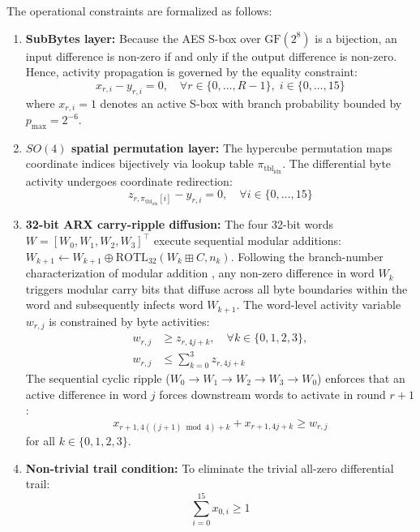 \documentclass[10pt,twocolumn]{article}
\begin{document}
The operational constraints are formalized as follows:
\begin{enumerate}
    \item \textbf{SubBytes layer:} Because the AES S-box over $\text{GF}(2^8)$ is a bijection, an input difference is non-zero if and only if the output difference is non-zero. Hence, activity propagation is governed by the equality constraint:
    \begin{equation}
        x_{r, i} - y_{r, i} = 0, \quad \forall r \in \{0, \dots, R-1\}, \; i \in \{0, \dots, 15\}
    \end{equation}
    where $x_{r, i} = 1$ denotes an active S-box with branch probability bounded by $p_{\max} = 2^{-6}$.
    
    \item \textbf{$SO(4)$ spatial permutation layer:} The hypercube permutation maps coordinate indices bijectively via lookup table $\pi_{\text{tbl}_{\text{idx}}}$. The differential byte activity undergoes coordinate redirection:
    \begin{equation}
        z_{r, \pi_{\text{tbl}_{\text{idx}}}[i]} - y_{r, i} = 0, \quad \forall i \in \{0, \dots, 15\}
    \end{equation}
    
    \item \textbf{32-bit ARX carry-ripple diffusion:} The four 32-bit words $W = [W_0, W_1, W_2, W_3]^\top$ execute sequential modular additions: $W_{k+1} \leftarrow W_{k+1} \oplus \text{ROTL}_{32}(W_k \boxplus C, n_k)$. Following the branch-number characterization of modular addition \cite{mouha2011differential, hadipour2023impossible}, any non-zero difference in word $W_k$ triggers modular carry bits that diffuse across all byte boundaries within the word and subsequently infects word $W_{k+1}$. The word-level activity variable $w_{r, j}$ is constrained by byte activities:
    \begin{equation}
    \begin{aligned}
        w_{r, j} &\ge z_{r, 4j + k}, \quad \forall k \in \{0, 1, 2, 3\}, \\
        w_{r, j} &\le \sum_{k=0}^3 z_{r, 4j + k}
    \end{aligned}
    \end{equation}
    The sequential cyclic ripple ($W_0 \to W_1 \to W_2 \to W_3 \to W_0$) enforces that an active difference in word $j$ forces downstream words to activate in round $r+1$:
    \begin{equation}
        x_{r+1, 4((j+1)\bmod 4) + k} + x_{r+1, 4j + k} \ge w_{r, j}
    \end{equation}
    for all $k \in \{0, 1, 2, 3\}$.
    
    \item \textbf{Non-trivial trail condition:} To eliminate the trivial all-zero differential trail:
    \begin{equation}
        \sum_{i=0}^{15} x_{0, i} \ge 1
    \end{equation}
\end{enumerate}
\end{document}
